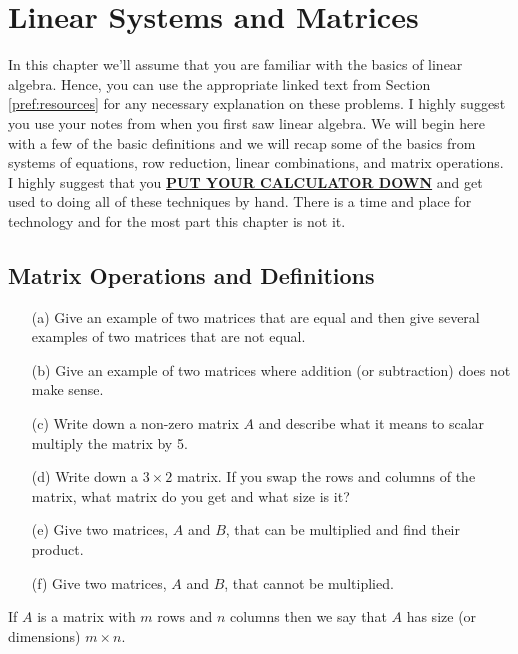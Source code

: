 \chapter{Linear Systems and Matrices}
In this chapter we'll assume that you are familiar with the basics of linear algebra.
Hence, you can use the appropriate linked text from Section \ref{pref:resources} for any
necessary explanation on these problems.  I highly suggest you use your notes from when
you first saw linear algebra.  We will begin here with a few of the basic definitions and
we will recap some of the basics from systems of equations, row reduction, linear
combinations, and matrix operations.  I highly suggest that you \underline{{\bf PUT YOUR
CALCULATOR DOWN}} and get used to doing all of these techniques by hand.  There is a time
and place for technology and for the most part this chapter is not it.




\section{Matrix Operations and Definitions}

\begin{problem}
    \begin{enumerate}
        \item[(a)] Give an example of two matrices that are equal and then give several
            examples of two matrices that are not equal.  
        \item[(b)] Give an example of two matrices where addition (or subtraction) does
            not make sense.
        \item[(c)] Write down a non-zero matrix $A$ and describe what it means to scalar
            multiply the matrix by 5.
        \item[(d)] Write down a $3\times 2$ matrix.  If you swap the rows and columns of
            the matrix, what matrix do you get and what size is it?
        \item[(e)] Give two matrices, $A$ and $B$, that can be multiplied and find their
            product.
        \item[(f)] Give two matrices, $A$ and $B$, that cannot be multiplied.
    \end{enumerate}
\end{problem}

\begin{definition}
    If $A$ is a matrix with $m$ rows and $n$ columns then we say that $A$ has
    size (or
    dimensions) $m \times n$.
\end{definition}

